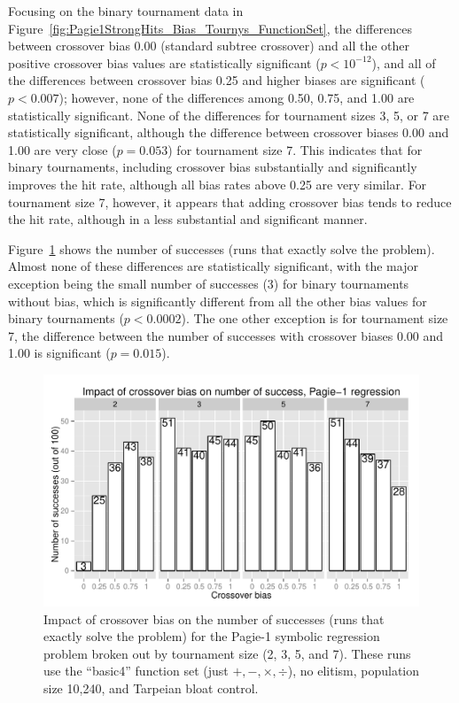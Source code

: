 \documentclass{sig-alternate}
\begin{document}
Focusing on the binary tournament data in Figure~\ref{fig:Pagie1StrongHits_Bias_Tournys_FunctionSet}, the differences
between crossover bias 0.00 (standard subtree crossover) and all the other positive crossover bias values are
statistically significant ($p<10^{-12}$), and all of the differences between crossover bias 0.25 and higher biases are
significant ($p<0.007$); however, none of the differences among 0.50, 0.75, and 1.00 are statistically significant.
None of the differences for tournament sizes 3, 5, or 7 are statistically significant, although the difference between
crossover biases 0.00 and 1.00 are very close ($p=0.053$) for tournament size 7. This indicates that for binary
tournaments, including crossover bias substantially and significantly improves the hit rate, although all bias rates
above 0.25 are very similar. For tournament size 7, however, it appears that adding crossover bias tends to reduce the
hit rate, although in a less substantial and significant manner.

%
%
%
%

Figure~\ref{fig:Pagie1StrongSuccesses} shows the number of successes (runs that exactly solve the problem). Almost none
of these differences are statistically significant, with the major exception being the small number of successes (3)
for binary tournaments without bias, which is significantly different from all the other bias values for binary
tournaments ($p<0.0002$). The one other exception is for tournament size 7, the difference between the number of
successes with crossover biases 0.00 and 1.00 is significant ($p=0.015$).

\begin{figure}
\centering
\includegraphics[width=0.45 \textwidth]{Plots/Pagie_1_Strong_Successes_vs_Bias.pdf}
\caption{Impact of crossover bias on the number of successes (runs that exactly solve the problem) for the Pagie-1
symbolic regression problem broken out by tournament size (2, 3, 5, and 7). These runs use the ``basic4'' function set
(just $+, -, \times, \div$), no elitism, population size 10,240, and Tarpeian bloat control.}
\label{fig:Pagie1StrongSuccesses}
\end{figure}
\end{document}
